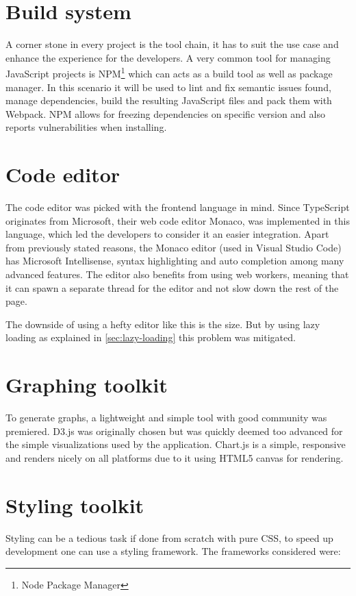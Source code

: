 \documentclass[12pt,a4paper]{report}
\begin{document}
\newpage
\section{Build system}
A corner stone in every project is the tool chain, it has to suit the use case and enhance the experience for the developers. A very common tool for managing JavaScript projects is NPM\footnote{Node Package Manager} which can acts as a build tool as well as package manager. In this scenario it will be used to lint and fix semantic issues found, manage dependencies, build the resulting JavaScript files and pack them with Webpack\cite{webpack}. NPM allows for freezing dependencies on specific version and also reports vulnerabilities when installing.

\section{Code editor}
The code editor was picked with the frontend language in mind. Since TypeScript originates from Microsoft, their web code editor Monaco, was implemented in this language, which led the developers to consider it an easier integration.
Apart from previously stated reasons, the Monaco editor (used in Visual Studio Code) has Microsoft Intellisense, syntax highlighting and auto completion among many advanced features.
The editor also benefits from using web workers, meaning that it can spawn a separate thread for the editor and not slow down the rest of the page.

The downside of using a hefty editor like this is the size. But by using lazy loading as explained in \autoref{sec:lazy-loading} this problem was mitigated.

\section{Graphing toolkit}
To generate graphs, a lightweight and simple tool with good community was premiered. D3.js was originally chosen but was quickly deemed too advanced for the simple visualizations used by the application. Chart.js is a simple, responsive and renders nicely on all platforms due to it using HTML5 canvas for rendering.

\section{Styling toolkit}
Styling can be a tedious task if done from scratch with pure CSS, to speed up development one can use a styling framework.
The frameworks considered were:
\end{document}
